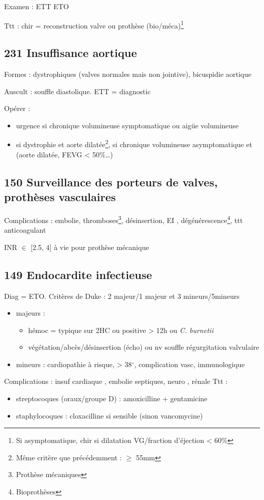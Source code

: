\documentclass[11pt]{article}
\begin{document}
Examen : ETT \textpm{} ETO

Ttt : chir = reconstruction valve ou prothèse (bio/méca)\footnote{Si asymptomatique, chir si dilatation VG/fraction d'éjection < 60\%}
\subsection{231 Insuffisance aortique}
\label{sec:org8850875}
Formes : dystrophiques (valves normales mais non jointive), bicuspidie aortique

Auscult : souffle diastolique. ETT = diagnostic

Opérer :
\begin{itemize}
\item urgence si chronique volumineuse symptomatique ou aigüe volumineuse
\item si dystrophie et aorte dilatée\footnote{Même critère que précédemment : \(\ge\) 55mm}, si chronique volumineuse asymptomatique et (aorte
dilatée, FEVG < 50\%\ldots{})
\end{itemize}
\subsection{150 Surveillance des porteurs de valves, prothèses vasculaires}
\label{sec:org81695d4}
Complications : embolie, thromboses\footnote{Prothèse mécaniques}, désinsertion, EI ,
dégénérescence\footnote{Bioprothèses}, ttt anticoagulant

INR \(\in\) [2.5, 4] à vie pour prothèse mécanique
\subsection{149 Endocardite infectieuse}
\label{sec:org59b0c2e}
Diag = ETO. Critères de Duke : 2 majeur/1 majeur et 3 mineurs/5mineurs
\begin{itemize}
\item majeurs : 
\begin{itemize}
\item hémoc = typique sur 2HC ou positive > 12h ou \emph{C. burnetii}
\item végétation/abcès/désinsertion (écho) ou nv souffle régurgitation valvulaire
\end{itemize}
\item mineurs : cardiopathie à risque, > 38\(^\circ\), complication vasc,
immunologique
\end{itemize}
Complications : insuf cardiaque , embolie septiques, neuro , rénale
Ttt :
\begin{itemize}
\item streptocoques (oraux/groupe D) : amoxicilline + gentamicine
\item staphylocoques : cloxacilline si sensible (sinon vancomycine)
\end{itemize}
\end{document}
